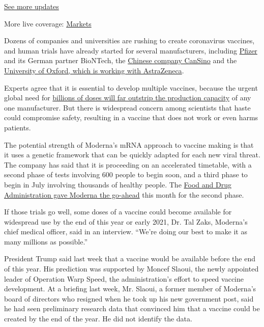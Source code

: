 \href{https://www.nytimes3xbfgragh.onion/2020/09/09/world/covid-19-coronavirus.html?action=click\&pgtype=Article\&state=default\&region=MAIN_CONTENT_1\&context=storylines_live_updates}{See
more updates}

More live coverage:
\href{https://www.nytimes3xbfgragh.onion/live/2020/09/09/business/stock-market-today-coronavirus?action=click\&pgtype=Article\&state=default\&region=MAIN_CONTENT_1\&context=storylines_live_updates}{Markets}

Dozens of companies and universities are rushing to create coronavirus
vaccines, and human trials have already started for several
manufacturers, including
\href{https://www.nytimes3xbfgragh.onion/2020/07/27/health/moderna-vaccine-covid.html}{Pfizer}
and its German partner BioNTech, the
\href{https://www.nytimes3xbfgragh.onion/2020/05/04/business/coronavirus-china-vaccine.html}{Chinese
company CanSino} and the
\href{https://www.nytimes3xbfgragh.onion/2020/04/27/world/europe/coronavirus-vaccine-update-oxford.html}{University
of Oxford, which is working with AstraZeneca}.

Experts agree that it is essential to develop multiple vaccines, because
the urgent global need for
\href{https://www.nytimes3xbfgragh.onion/2020/05/01/health/coronavirus-vaccine-supplies.html}{billions
of doses will far outstrip the production capacity} of any one
manufacturer. But there is widespread concern among scientists that
haste could compromise safety, resulting in a vaccine that does not work
or even harms patients.

The potential strength of Moderna's mRNA approach to vaccine making is
that it uses a genetic framework that can be quickly adapted for each
new viral threat. The company has said that it is proceeding on an
accelerated timetable, with a second phase of tests involving 600 people
to begin soon, and a third phase to begin in July involving thousands of
healthy people. The
\href{https://www.nytimes3xbfgragh.onion/2020/05/07/health/coronavirus-vaccine-moderna.html}{Food
and Drug Administration gave Moderna the go-ahead} this month for the
second phase.

If those trials go well, some doses of a vaccine could become available
for widespread use by the end of this year or early 2021, Dr. Tal Zaks,
Moderna's chief medical officer, said in an interview. ``We're doing our
best to make it as many millions as possible.''

President Trump said last week that a vaccine would be available before
the end of this year. His prediction was supported by Moncef Slaoui, the
newly appointed leader of Operation Warp Speed, the administration's
effort to speed vaccine development. At a briefing last week, Mr.
Slaoui, a former member of Moderna's board of directors who resigned
when he took up his new government post, said he had seen preliminary
research data that convinced him that a vaccine could be created by the
end of the year. He did not identify the data.

